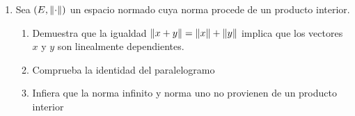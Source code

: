 \documentclass[12pt]{article}
\newcommand{\subscript}[2]{$#1 _ #2$}
\newcommand\N{\ensuremath{\mathbb{N}}}
\begin{document}
\begin{enumerate}[label=\textbf{\arabic*}.]
\begin{proof}
\begin{enumerate}[label=(\subscript{D}{{\arabic*}})]
En el ejercicio \textbf{1.} se demostro que $\forall \: n \in \N$ s.t.q.
\begin{equation*}
    \frac{1+ \abs{x_n-y_n}}{\abs{x_n-y_n}} \leqslant \frac{1+ \abs{x_n-z_n}}{\abs{x_n-z_n}} + \frac{1+ \abs{z_n-y_n}}{\abs{z_n-y_n}}
\end{equation*}
Así que
\begin{equation*}
    d(x,y) = \sum_{n=1}^{\infty} a_n \frac{1+ \abs{x_n-y_n}}{\abs{x_n-y_n}}  \leqslant \sum_{n=1}^{\infty} a_n \left( \frac{1+ \abs{x_n-z_n}}{\abs{x_n-z_n}} + \frac{1+ \abs{z_n-y_n}}{\abs{z_n-y_n}} \right)
\end{equation*}
\begin{equation*}
    =\sum_{n=1}^{\infty} \left(  a_n \frac{1+ \abs{x_n-z_n}}{\abs{x_n-z_n}} +  a_n \frac{1+ \abs{z_n-y_n}}{\abs{z_n-y_n}} \right) 
\end{equation*}
\begin{equation*}
      = \sum_{n=1}^{\infty}  a_n \frac{1+ \abs{x_n-z_n}}{\abs{x_n-z_n}} + \sum_{n=1}^{\infty} a_n \frac{1+ \abs{z_n-y_n}}{\abs{z_n-y_n}} = d(x,z) + d(z,y)
\end{equation*}
\end{enumerate}
$\therefore d$ es una métrica en $E$
\end{proof}

\begin{proof}
    Para que $d(x,y) = \norm{x-y}$ sea compatible se debe de cumplir $d(\lambda x, \lambda y ) = \abs{\lambda} d(x,y)$

    \begin{equation*}
        d(\lambda x, \lambda y ) = \sum_{n=1}^{\infty} a_n \frac{1+ \abs{\lambda x_n-\lambda y_n}}{\abs{\lambda x_n- \lambda y_n}} = \sum_{n=1}^{\infty} a_n \frac{1+ \abs{\lambda \cdot (x_n-y_n)}}{\abs{\lambda \cdot (x_n-y_n)}}
    \end{equation*}
    \begin{equation*}
        \sum_{n=1}^{\infty} a_n \frac{1+ \abs{\lambda} \abs{ x_n-y_n}}{\abs{\lambda} \abs{ x_n-y_n}} \neq \abs{\lambda} 
        \sum_{n=1}^{\infty} a_n \frac{1+  \abs{ x_n-y_n}}{\abs{ x_n-y_n}}
    \end{equation*}
\end{proof}

\item Sea $(E, \norm{\cdot})$ un espacio normado cuya norma procede de un producto interior.
\begin{enumerate}
    \item Demuestra que la igualdad $\norm{x+y} = \norm{x} + \norm{y}$ implica que los vectores $x$ y $y$ son linealmente dependientes.
    \item Comprueba la identidad del paralelogramo
    \item Infiera que la norma infinito y norma uno no provienen de un producto interior
\end{enumerate}


\end{enumerate}
\end{document}

